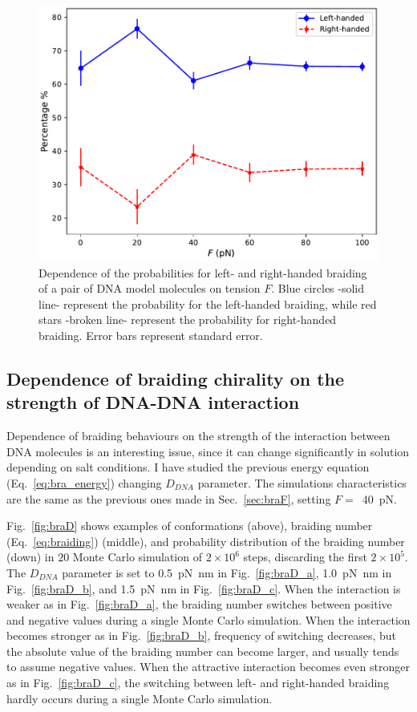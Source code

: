 \documentclass[a4paper,10pt]{article}
\begin{document}
\begin{figure}[tb]
\centering
\includegraphics[width=.5\textwidth]{brF_br_gr.pdf}
\caption{Dependence of the probabilities for left- and right-handed braiding of a pair of DNA model molecules on tension $F$.
Blue circles -solid line- represent the probability for the left-handed braiding, while red stars -broken line- represent the probability for right-handed braiding.
Error bars represent standard error.}
\label{fig:braF_pr}
\end{figure}

\subsection{Dependence of braiding chirality on the strength of DNA-DNA interaction}
Dependence of braiding behaviours on the strength of the interaction between DNA molecules is an interesting issue, since it can change significantly in solution depending on salt conditions.
I have studied the previous energy equation (Eq.~\ref{eq:bra_energy}) changing $D_{DNA}$ parameter.
The simulations characteristics are the same as the previous ones made in Sec.~\ref{sec:braF}, setting $F=$~\SI{40}{\pico\newton}.

Fig.~\ref{fig:braD} shows examples of conformations (above), braiding number (Eq.~\ref{eq:braiding}) (middle), and probability distribution of the braiding number (down) in $20$ Monte Carlo simulation of $2\times 10^6$ steps, discarding the first $2\times 10^5$.
The $D_{DNA}$ parameter is set to \SI{0.5}{\pico\newton\nano\meter} in Fig.~\ref{fig:braD_a}, \SI{1.0}{\pico\newton\nano\meter} in Fig.~\ref{fig:braD_b}, and \SI{1.5}{\pico\newton\nano\meter} in Fig.~\ref{fig:braD_c}.
When the interaction is weaker as in Fig.~\ref{fig:braD_a}, the braiding number switches between positive and negative values during a single Monte Carlo simulation.
When the interaction becomes stronger as in Fig.~\ref{fig:braD_b}, frequency of switching decreases, but the absolute value of the braiding number can become larger, and usually tends to assume negative values.
When the attractive interaction becomes even stronger as in Fig.~\ref{fig:braD_c}, the switching between left- and right-handed braiding hardly occurs during a single Monte Carlo simulation.
\end{document}
